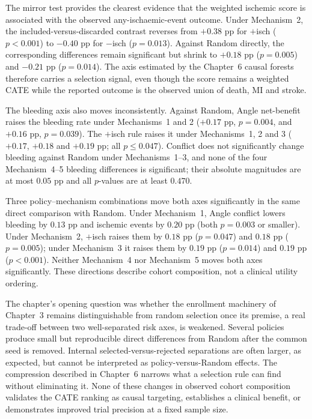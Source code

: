 \vspace{10pt}

The mirror test provides the clearest evidence that the weighted ischemic score is
associated with the observed any-ischaemic-event outcome. Under Mechanism~2, the
included-versus-discarded contrast reverses from $+0.38$ pp for $+$isch ($p<0.001$) to
$-0.40$ pp for $-$isch ($p=0.013$). Against Random directly, the corresponding
differences remain significant but shrink to $+0.18$ pp ($p=0.005$) and $-0.21$ pp
($p=0.014$). The axis estimated by the Chapter~6 causal forests therefore carries a
selection signal, even though the score remains a weighted CATE while the reported
outcome is the observed union of death, MI and stroke.

\vspace{10pt}

The bleeding axis also moves inconsistently. Against Random, Angle net-benefit raises the
bleeding rate under Mechanisms~1 and 2 ($+0.17$ pp, $p=0.004$, and $+0.16$ pp,
$p=0.039$). The $+$isch rule raises it under Mechanisms~1, 2 and 3 ($+0.17$, $+0.18$ and
$+0.19$ pp; all $p\leq0.047$). Conflict does not significantly change bleeding against
Random under Mechanisms~1--3, and none of the four Mechanism~4--5 bleeding differences is
significant; their absolute magnitudes are at most $0.05$ pp and all $p$-values are at
least $0.470$.

\vspace{10pt}

Three policy--mechanism combinations move both axes significantly in the same direct
comparison with Random. Under Mechanism~1, Angle conflict lowers bleeding by $0.13$ pp and
ischemic events by $0.20$ pp (both $p=0.003$ or smaller). Under Mechanism~2, $+$isch
raises them by $0.18$ pp ($p=0.047$) and $0.18$ pp ($p=0.005$); under Mechanism~3 it raises
them by $0.19$ pp ($p=0.014$) and $0.19$ pp ($p<0.001$). Neither Mechanism~4 nor
Mechanism~5 moves both axes significantly. These directions describe cohort composition,
not a clinical utility ordering.

\vspace{10pt}

The chapter's opening question was whether the enrollment machinery of Chapter~3 remains
distinguishable from random selection once its premise, a real trade-off between two
well-separated risk axes, is weakened. Several policies produce small but reproducible
direct differences from Random after the common seed is removed. Internal
selected-versus-rejected separations are often larger, as expected, but cannot be
interpreted as policy-versus-Random effects. The compression described in Chapter~6
narrows what a selection rule can find without eliminating it. None of these changes in
observed cohort composition validates the CATE ranking as causal targeting, establishes a
clinical benefit, or demonstrates improved trial precision at a fixed sample size.
